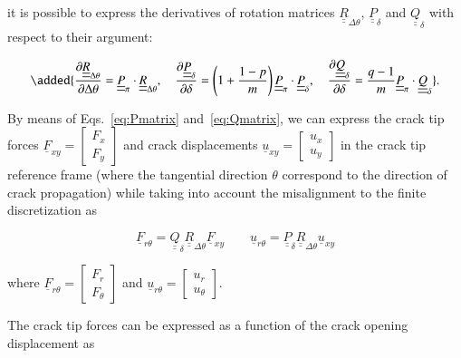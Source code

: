 \documentclass[review]{elsarticle}
\begin{document}
it is possible to express the derivatives of rotation matrices $\underline{\underline{R}}_{\Delta\theta}$, $\underline{\underline{P}}_{\delta}$ and $\underline{\underline{Q}}_{\delta}$ with respect to their argument:

\begin{equation}\label{eq:rotmatdev}
\added{\frac{\partial \underline{\underline{R}}_{\Delta\theta}}{\partial \Delta\theta}=\underline{\underline{P}}_{\pi}\cdot\underline{\underline{R}}_{\Delta\theta},\quad\frac{\partial \underline{\underline{P}}_{\delta}}{\partial \delta}=\left(1+\frac{1-p}{m}\right)\underline{\underline{P}}_{\pi}\cdot\underline{\underline{P}}_{\delta},\quad\frac{\partial \underline{\underline{Q}}_{\delta}}{\partial \delta}=\frac{q-1}{m}\underline{\underline{P}}_{\pi}\cdot\underline{\underline{Q}}_{\delta}}.
\end{equation}

By means of Eqs.~\ref{eq:Pmatrix} and~\ref{eq:Qmatrix}, we can express the crack tip forces $
\underline{F}_{xy}=\begin{bmatrix}
F_{x} \\
F_{y}
\end{bmatrix}$ and crack displacements  $
\underline{u}_{xy}=\begin{bmatrix}
u_{x} \\
u_{y}
\end{bmatrix}$ in the crack tip reference frame (where the tangential direction $\theta$ correspond to the direction of crack propagation) while taking into account the misalignment to the finite  discretization as 

\begin{equation}\label{eq:FUrot}
\underline{F}_{r\theta}=\underline{\underline{Q}}_{\delta}\underline{\underline{R}}_{\Delta\theta}\underline{F}_{xy}\qquad\underline{u}_{r\theta}=\underline{\underline{P}}_{\delta}\underline{\underline{R}}_{\Delta\theta}\underline{u}_{xy}
\end{equation}

where $\underline{F}_{r\theta}=\begin{bmatrix}
F_{r} \\
F_{\theta}
\end{bmatrix}$ and $\underline{u}_{r\theta}=\begin{bmatrix}
u_{r} \\
u_{\theta}
\end{bmatrix}$.

The crack tip forces can be expressed as a function of the crack opening displacement as 
\end{document}
